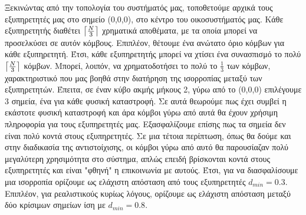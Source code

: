  Ξεκινώντας από την τοπολογία του συστήματός μας, τοποθετούμε αρχικά τους εξυπηρετητές μας στο σημείο (0,0,0), στο κέντρο του οικοσυστήματός μας. Κάθε εξυπηρετητής διαθέτει $\ceil*{\frac{N}{3}}$ χρηματικά αποθέματα, με τα οποία μπορεί να προσελκύσει σε αυτόν κόμβους. Επιπλέον, θέτουμε ένα ανώτατο όριο κόμβων για κάθε εξυπηρετητή. Έτσι, κάθε εξυπηρετητής μπορεί να χτίσει ένα συνασπισμό το πολύ $\ceil*{\frac{N}{3}}$ κόμβων. Μπορεί, λοιπόν, να χρηματοδοτήσει το πολύ το $\frac{1}{3}$ των κόμβων, χαρακτηριστικό που μας βοηθά στην διατήρηση της ισορροπίας μεταξύ των εξυπηρετητών. Έπειτα, σε έναν κύβο ακμής μήκους 2, γύρω από το (0,0,0) επιλέγουμε 3 σημεία, ένα για κάθε φυσική καταστροφή. Σε αυτά θεωρούμε πως έχει συμβεί η εκάστοτε φυσική καταστροφή και άρα κόμβοι γύρω από αυτά θα έχουν χρήσιμη πληροφορία για τους εξυπηρετητές μας. Εξασφαλίζουμε επίσης πως τα σημεία δεν είναι πολύ κοντά στους εξυπηρετητές. Σε μια τέτοια περίπτωση, όπως θα δούμε και στην διαδικασία της αντιστοίχισης, οι κόμβοι γύρω από αυτό θα παρουσίαζαν πολύ μεγαλύτερη χρησιμότητα στο σύστημα, απλώς επειδή βρίσκονται κοντά στους εξυπηρετητές και είναι "φθηνή" η επικοινωνία με αυτούς. Έτσι, για να διασφαλίσουμε μια ισορροπία ορίζουμε ως ελάχιστη απόσταση από τους εξυπηρετητές $d_{min} = 0.3$. Επιπλέον, για ρεαλιστικούς κυρίως λόγους, ορίζουμε ως ελάχιστη απόσταση μεταξύ δύο κρίσιμων σημείων ίση με $d_{min} = 0.8$. 

